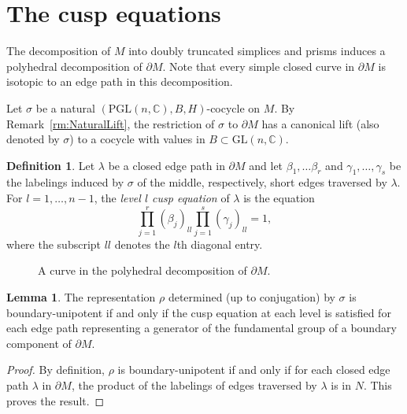 \documentclass[12pt]{amsart}
\theoremstyle{definition}
\newtheorem{lemma}[theorem]{Lemma}
\newtheorem{definition}[theorem]{Definition}
\numberwithin{equation}{section}
\def\PGL{\mathrm{PGL}}
\def\GL{\mathrm{GL}}
\def\C{\mathbb{C}}
\begin{document}
\section{The cusp equations}\label{sec:CuspEquations}

The decomposition of $M$ into doubly truncated simplices and prisms induces a polyhedral decomposition of $\partial M$. Note that every simple closed curve in $\partial M$ is isotopic to an edge path in this decomposition. %

Let $\sigma$ be a natural $(\PGL(n,\C),B,H)$-cocycle on $M$. By Remark~\ref{rm:NaturalLift}, the restriction of $\sigma$ to $\partial M$ has a canonical lift (also denoted by $\sigma$) to a cocycle with values in $B\subset\GL(n,\C)$.  

\begin{definition}
Let $\lambda$ be a closed edge path in $\partial M$ and let $\beta_1,\dots\beta_r$ and $\gamma_1,\dots,\gamma_s$ be the labelings induced by $\sigma$ of the middle, respectively, short edges traversed by $\lambda$. For $l=1,\dots, n-1$, the \emph{level $l$ cusp equation} of $\lambda$ is the equation
\begin{equation}
\prod_{j=1}^r(\beta_j)_{ll}\prod_{j=1}^s(\gamma_j)_{ll}=1,
\end{equation}
where the subscript $ll$ denotes the $l$th diagonal entry.
\end{definition}

\begin{figure}[htb]
\begin{center}
\scalebox{0.9}{
}
\end{center}
\caption{A curve in the polyhedral decomposition of $\partial M$.}
\end{figure}

\begin{lemma}
The representation $\rho$ determined (up to conjugation) by $\sigma$ is boundary-unipotent if and only if the cusp equation at each level is satisfied for each edge path representing a generator of the fundamental group of a boundary component of $\partial M$.
\end{lemma}

\begin{proof}
By definition, $\rho$ is boundary-unipotent if and only if for each closed edge path $\lambda$ in $\partial M$, the product of the labelings of edges traversed by $\lambda$ is in $N$. This proves the result.
\end{proof}
\end{document}
